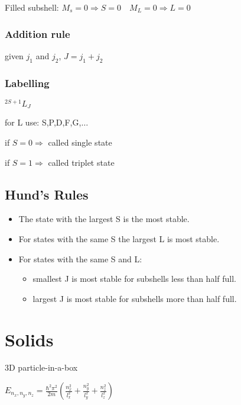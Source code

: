 \documentclass[10pt,a4paper]{scrartcl}
\begin{document}
\begin{multicols*}{3}
	Filled subshell: $M_s=0\Rightarrow S=0\quad M_L=0\Rightarrow L=0$	
	
	
	\subsubsection{Addition rule}
	
	given $j_1$ and $j_2$, $J=j_1+j_2$
	
	
	\subsubsection{Labelling}
	
	$^{2S+1}L_J$
	
	for L use: S,P,D,F,G,$\ldots$
	
	if $S=0\Rightarrow$ called single state
	
	if $S=1\Rightarrow$ called triplet state
	
	\subsection{Hund's Rules}
	\small
	\begin{itemize}
	\compaq
	\item
	The state with the largest S is the most stable.
	\item
	For states with the same S the largest L is most stable.
	\item
	For states with the same S and L:
	\begin{itemize}
	\compaq
	\item
	smallest J is most stable for subshells less than half full.
	\item
	largest J is most stable for subshells more than half full.
	\end{itemize}
	\end{itemize}
	\normalsize
	
	\section{Solids}
	
	\dahe 3D particle-in-a-box 
	
	\dahe $E_{n_x,n_y,n_z}=\frac{\hbar^2\pi^2}{2m}\left(\frac{n_x^2}{l_x^2}+\frac{n_y^2}{l_y^2}+\frac{n_z^2}{l_z^2}\right)$
	

\end{multicols*}
\end{document}
